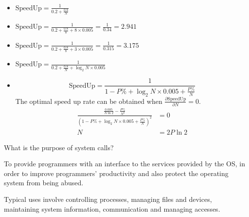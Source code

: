 \begin{exercise}[]
{\begin{itemize}
  \end{itemize}}
  \begin{solution}
  \par{~}
  \begin{itemize}
    \item $\text{SpeedUp} = \frac{1}{0.2 + \frac{0.8}{N}}$
    \item $\text{SpeedUp} = \frac{1}{0.2 + \frac{0.8}{8} + 8 \times 0.005} = \frac{1}{0.34} = 2.941$
    \item $\text{{SpeedUp}} = \frac{1}{0.2 + \frac{0.8}{8} + 3 \times 0.005} = \frac{1}{0.315} = 3.175$
    \item $\text{{SpeedUp}} = \frac{1}{0.2 + \frac{0.8}{N} + \log_{2}N \times 0.005}$
    \item {
      \begin{equation}
        \text{SpeedUp} = \frac{1}{1-P\% + \log_{2}N \times 0.005 + \frac{P\%}{N}}
      \end{equation}
      The optimal speed up rate can be obtained when $\frac{\partial \text{SpeedUp}}{\partial N} = 0$.
      \begin{equation}
        \begin{aligned}
          \frac{\frac{0.005}{N \ln 2} - \frac{P\%}{N^2}}{\left(1-P\% + \log_{2}N \times 0.005 + \frac{P\%}{N}\right)^2} &= 0 \\
          N &= 2P \ln 2
        \end{aligned}
      \end{equation}
    }
  \end{itemize}
  \end{solution}
  \label{ex2}
\end{exercise}



\begin{exercise}[]{What is the purpose of system calls?   }
  \begin{solution}
  To provide programmers with an interface to the services provided by the OS, in order to improve programmers' productivity and also protect the operating system from being abused.

  Typical uses involve controlling processes, managing files and devices, maintaining system information, communication and managing accesses.
  \end{solution}
  \label{ex3}
\end{exercise}



